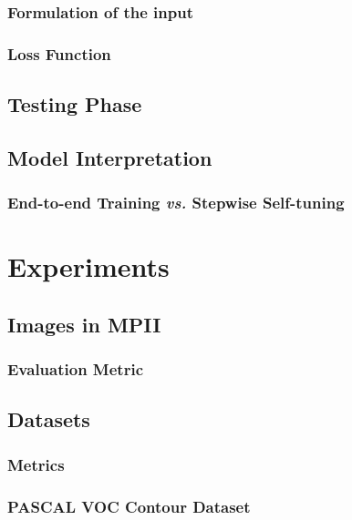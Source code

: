 \documentclass[senior]{IPSstyle}
\begin{document}
\subsection{Formulation of the input}
\subsection{Loss Function}



\section{Testing Phase} \label{testing phase}

\section{Model Interpretation} \label{interpretation}
\subsection{End-to-end Training \emph{vs.} Stepwise Self-tuning}



\chapter{Experiments} \label{experiments}


\section{Images in MPII}



\subsection{Evaluation Metric}

\section{Datasets}
\subsection{Metrics}
\subsection{PASCAL VOC Contour Dataset}
\end{document}
